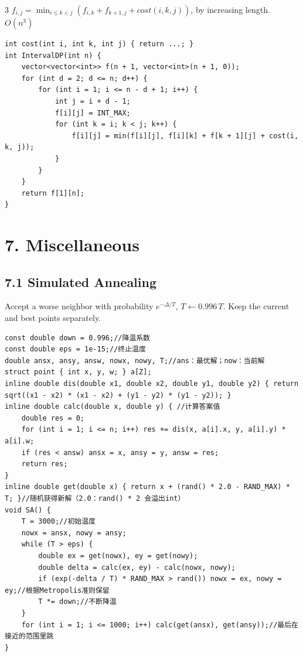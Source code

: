 \documentclass[8pt]{extarticle}
\begin{document}
\begin{multicols*}{3}
$f_{i,j} = \min_{i \le k < j} (f_{i,k} + f_{k+1,j} + cost(i, k, j))$, by increasing length. $O(n^3)$


\begin{lstlisting}
int cost(int i, int k, int j) { return ...; }
int IntervalDP(int n) {
    vector<vector<int>> f(n + 1, vector<int>(n + 1, 0));
    for (int d = 2; d <= n; d++) {
        for (int i = 1; i <= n - d + 1; i++) {
            int j = i + d - 1;
            f[i][j] = INT_MAX;
            for (int k = i; k < j; k++) {
                f[i][j] = min(f[i][j], f[i][k] + f[k + 1][j] + cost(i, k, j));
            }
        }
    }
    return f[1][n];
}
\end{lstlisting}

\section*{7. Miscellaneous}

\subsection*{7.1 Simulated Annealing}

Accept a worse neighbor with probability $e^{-\Delta / T}$, $T \leftarrow 0.996\,T$. Keep the current and best points separately.


\begin{lstlisting}
const double down = 0.996;//降温系数
const double eps = 1e-15;//终止温度
double ansx, ansy, answ, nowx, nowy, T;//ans：最优解；now：当前解
struct point { int x, y, w; } a[Z];
inline double dis(double x1, double x2, double y1, double y2) { return sqrt((x1 - x2) * (x1 - x2) + (y1 - y2) * (y1 - y2)); }
inline double calc(double x, double y) { //计算答案值
    double res = 0;
    for (int i = 1; i <= n; i++) res += dis(x, a[i].x, y, a[i].y) * a[i].w;
    if (res < answ) ansx = x, ansy = y, answ = res;
    return res;
}
inline double get(double x) { return x + (rand() * 2.0 - RAND_MAX) * T; }//随机获得新解（2.0：rand() * 2 会溢出int）
void SA() {
    T = 3000;//初始温度
    nowx = ansx, nowy = ansy;
    while (T > eps) {
        double ex = get(nowx), ey = get(nowy);
        double delta = calc(ex, ey) - calc(nowx, nowy);
        if (exp(-delta / T) * RAND_MAX > rand()) nowx = ex, nowy = ey;//根据Metropolis准则保留
        T *= down;//不断降温
    }
    for (int i = 1; i <= 1000; i++) calc(get(ansx), get(ansy));//最后在接近的范围里跳
}
\end{lstlisting}


\end{multicols*}
\end{document}

